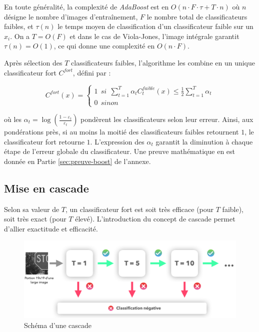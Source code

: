 \documentclass[12pt,a4paper]{article}
\begin{document}
En toute généralité, la complexité de \textit{AdaBoost} est en $O(n \cdot F \cdot \tau + T \cdot n)$ où $n$ désigne le nombre d'images d'entraînement, $F$ le nombre total de classificateurs faibles, et $\tau(n)$ le temps moyen de classification d'un classificateur faible sur un $x_i$. On a $T = O(F)$ et dans le cas de Viola-Jones, l'image intégrale garantit $\tau(n) = O(1)$, ce qui donne une complexité en $O(n \cdot F)$.

Après sélection des $T$ classificateurs faibles, l'algorithme les combine en un unique classificateur fort $C^{fort}$, défini par :

\begin{equation}
    C^{fort}(x) = 
    \begin{cases}
    1 \:\: si \:\: \sum_{t=1}^T \alpha_t C_t^{faible}(x) \leq \frac{1}{2} \sum_{t=1}^T \alpha_t \\
    0 \:\: sinon
    \end{cases}
\end{equation}

où les $\alpha_t = \log(\frac{1 - \varepsilon_t}{\varepsilon_t})$ pondèrent les classificateurs selon leur erreur. Ainsi, aux pondérations près, si au moins la moitié des classificateurs faibles retournent $1$, le classificateur fort retourne $1$. L'expression des $\alpha_t$ garantit la diminution à chaque étape de l'erreur globale du classificateur. Une preuve mathématique en est donnée en Partie \ref{sec:preuve-boost} de l'annexe.


\subsection{Mise en cascade}
Selon sa valeur de $T$, un classificateur fort est soit très efficace (pour $T$ faible), soit très exact (pour $T$ élevé). L'introduction du concept de cascade permet d'allier exactitude et efficacité. 

\begin{figure}[h]
    \includegraphics[scale = 0.4]{cascade}
    \centering
    \caption{Schéma d'une cascade}
\end{figure}
\end{document}
